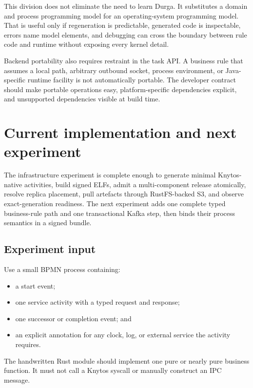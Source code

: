 This division does not eliminate the need to learn Durga. It substitutes a
domain and process programming model for an operating-system programming model.
That is useful only if regeneration is predictable, generated code is
inspectable, errors name model elements, and debugging can
cross the boundary between rule code and runtime without exposing every kernel
detail.

Backend portability also requires restraint in the task API. A business rule
that assumes a local path, arbitrary outbound socket, process environment, or
Java-specific runtime facility is not automatically portable. The developer
contract should make portable operations easy, platform-specific dependencies
explicit, and unsupported dependencies visible at build time.

\section{Current implementation and next experiment}

The infrastructure experiment is complete enough to generate minimal
Knytos-native activities, build signed ELFs, admit a multi-component release
atomically, resolve replica placement, pull artefacts through RustFS-backed S3,
and observe exact-generation readiness. The next experiment adds one complete
typed business-rule path and one transactional Kafka step, then binds their
process semantics in a signed bundle.

\subsection{Experiment input}

Use a small BPMN process containing:

\begin{itemize}
    \item a start event;
    \item one service activity with a typed request and response;
    \item one successor or completion event; and
    \item an explicit annotation for any clock, log, or external service the
        activity requires.
\end{itemize}

The handwritten Rust module should implement one pure or nearly pure business
function. It must not call a Knytos syscall or manually construct an IPC
message.

